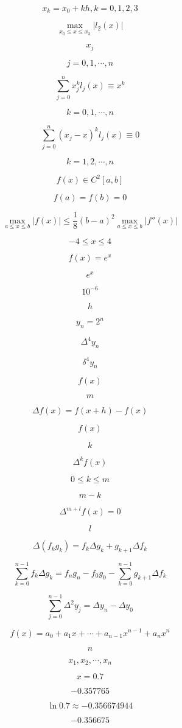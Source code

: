 \documentclass[fontset=fandol]{ctexart}
\begin{document}
\[x_k=x_0+kh,k=0,1,2,3\]

\[\max_{x_0\leqslant x\leqslant x_3}|l_2(x)|\]

\[x_j\]

\[j=0,1,\cdots,n\]

\[\displaystyle\sum_{j=0}^n x_j^kl_j(x)\equiv x^k\]

\[k=0,1,\cdots,n\]

\[\displaystyle\sum_{j=0}^n(x_j-x)^kl_j(x)\equiv0\]

\[k=1,2,\cdots,n\]

\[f(x)\in C^2[a,b]\]

\[f(a)=f(b)=0\]

\[\displaystyle\max_{a\leqslant x\leqslant b}|f(x)|\leqslant\frac18(b-a)^2\max_{a\leqslant x\leqslant b}|f''(x)|\]

\[-4\leqslant x\leqslant4\]

\[f(x)=e^x\]

\[e^x\]

\[10^{-6}\]

\[h\]

\[y_n=2^n\]

\[\Delta^4y_n\]

\[\delta^4y_n\]

\[f(x)\]

\[m\]

\[\Delta f(x)=f(x+h)-f(x)\]

\[f(x)\]

\[k\]

\[\Delta^kf(x)\]

\[0\leqslant k\leqslant m\]

\[m-k\]

\[\Delta^{m+l}f(x)=0\]

\[l\]

\[\Delta(f_kg_k)=f_k\Delta g_k+g_{k+1}\Delta f_k\]

\[\displaystyle\sum_{k=0}^{n-1}f_k\Delta g_k=f_ng_n-f_0g_0-\sum_{k=0}^{n-1}g_{k+1}\Delta f_k\]

\[\displaystyle\sum_{j=0}^{n-1}\Delta^2y_j=\Delta y_n-\Delta y_0\]

\[f(x)=a_0+a_1x+\cdots+a_{n-1}x^{n-1}+a_nx^n\]

\[n\]

\[x_1,x_2,\cdots,x_n\]

\[x=0.7\]

\[-0.357765\]

\[\ln0.7\approx-0.356674944\]

\[-0.356675\]
\end{document}

